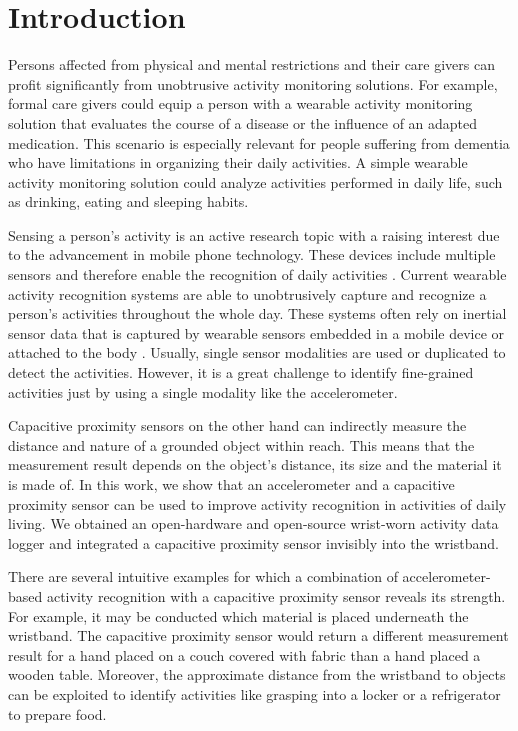 \documentclass[runningheads,a4paper]{llncs}
\begin{document}
\section{Introduction}

Persons affected from physical and mental restrictions and their care givers can profit significantly from unobtrusive activity monitoring solutions. For example, formal care givers could equip a person with a wearable activity monitoring solution that evaluates the course of a disease or the influence of an adapted medication. This scenario is especially relevant for people suffering from dementia who have limitations in organizing their daily activities. A simple wearable activity monitoring solution could analyze activities performed in daily life, such as drinking, eating and sleeping habits. 

Sensing a person's activity is an active research topic with a raising interest due to the advancement in mobile phone technology. These devices include multiple sensors and therefore enable the recognition of daily activities \cite{brezmes2009activity}. Current wearable activity recognition systems are able to unobtrusively capture and recognize a person's activities throughout the whole day. These systems often rely on inertial sensor data that is captured by wearable sensors embedded in a mobile device \cite{brezmes2009activity} or attached to the body \cite{Ravi2005}. Usually, single sensor modalities are used or duplicated to detect the activities. However, it is a great challenge to identify fine-grained activities just by using a single modality like the accelerometer.

Capacitive proximity sensors on the other hand can indirectly measure the distance and nature of a grounded object within reach. This means that the measurement result depends on the object's distance, its size and the material it is made of. In this work, we show that an accelerometer and a capacitive proximity sensor can be used to improve activity recognition in activities of daily living.
We obtained an open-hardware and open-source wrist-worn activity data logger \cite{hedgehog} and integrated a capacitive proximity sensor invisibly into the wristband. 

There are several intuitive examples for which a combination of accelerometer-based activity recognition with a capacitive proximity sensor reveals its strength. For example, it may be conducted which material is placed underneath the wristband. The capacitive proximity sensor would return a different measurement result for a hand placed on a couch covered with fabric than a hand placed a wooden table. Moreover, the approximate distance from the wristband to objects can be exploited to identify activities like grasping into a locker or a refrigerator to prepare food.
\end{document}
